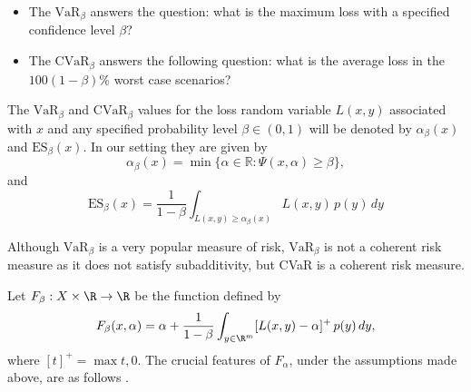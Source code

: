 \begin{remark}\normalfont \hspace{1cm}
	\begin{itemize}
		\item The $\mbox{VaR}_\beta$ answers the question: what is the maximum loss with a specified confidence level $\beta$?
		\item The $\mbox{CVaR}_\beta$ answers the following question: what is the average loss in the $100(1-\beta)$\% worst case scenarios?
	\end{itemize}
\end{remark}

The $\mbox{VaR}_\beta$ and $\mbox{CVaR}_\beta$ values for the loss random variable $L(x,y)$ associated with $x$ and any specified probability level $\beta \in (0,1)$ will be denoted by $\alpha_\beta(x)$ and $\mbox{ES}_\beta(x)$. In our setting they are given by
\begin{equation}\label{eq:var}
	\alpha_\beta(x) = \min\{\alpha\in\mathbb{R} : \Psi(x,\alpha)\geq \beta \},
\end{equation}
and
\begin{equation}\label{eq:cvar}
	\mbox{ES}_\beta(x) = \frac{1}{1-\beta}\int_{L(x,y)\geq \alpha_\beta(x)} L(x,y)\, p(y)\,dy
\end{equation}

Although $\mbox{VaR}_\beta$ is a very popular measure of risk, $\mbox{VaR}_\beta$ is not a coherent risk measure as it does not satisfy subadditivity, but CVaR is a coherent risk measure.

Let $F_\beta:X\times \R \to \R$ be the function defined by
\[
	F_\beta(x,\alpha) = \alpha +\frac{1}{1-\beta}\int_{y\in\R^m}[L(x,y)-\alpha]^+ \, p(y)\, dy,
\]
where $[t]^+ = \max{t,0}$. The crucial features of $F_\alpha$, under the assumptions made above, are as
follows \cite[Theorem 2]{RockafellarUryasev2001}.


